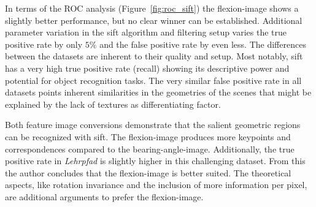 In terms of the \acrshort{ROC} analysis (Figure~\ref{fig:roc_sift}) the \gls{flexion-image} shows a slightly better performance, but no clear winner can be established.
Additional parameter variation in the \acrshort{sift} algorithm and filtering setup varies the true positive rate by only $5\%$ and the false positive rate by even less.
The differences between the datasets are inherent to their quality and setup.
Most notably, \acrshort{sift} has a very high true positive rate (recall) showing its descriptive power and potential for object recognition tasks.
The very similar false positive rate in all datasets points inherent similarities in the geometries of the scenes that might be explained by the lack of textures as differentiating factor.

Both feature image conversions demonstrate that the salient geometric regions can be recognized with \acrshort{sift}.
The \gls{flexion-image} produces more keypoints and correspondences compared to the \gls{bearing-angle-image}.
Additionally, the true positive rate in \emph{Lehrpfad} is slightly higher in this challenging dataset.
From this the author concludes that the \gls{flexion-image} is better suited.
The theoretical aspects, like rotation invariance and the inclusion of more information per pixel, are additional arguments to prefer the \gls{flexion-image}.
